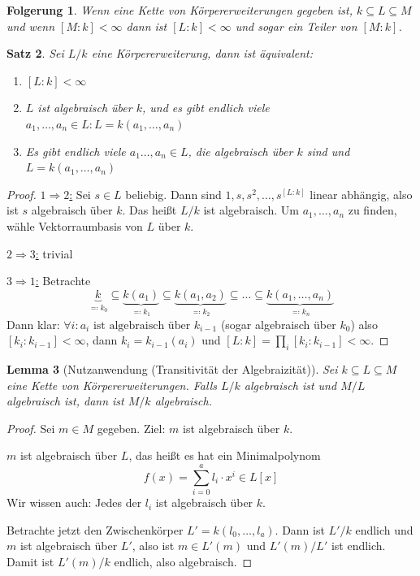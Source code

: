 \documentclass[a4paper,12pt,numbers=noenddot,parskip=full]{scrartcl}
\newcommand{\heading}{\underline}
\theoremstyle{dotless}
\newtheorem{theorem}{Satz}[section]
\newtheorem{corollary}[theorem]{Folgerung}
\newtheorem{lemma}[theorem]{Lemma}
\theoremstyle{remark}
\begin{document}
	\begin{corollary}
		Wenn eine Kette von Körpererweiterungen gegeben ist, $k \subseteq L \subseteq M$ und wenn $[M:k] < \infty$ dann ist $[L:k] < \infty$ und sogar ein Teiler von $[M:k]$.
	\end{corollary}

	\begin{theorem}
		\label{thm:1_27}
		Sei $L/k$ eine Körpererweiterung, dann ist äquivalent:
		\begin{enumerate}
			\item $[L:k] < \infty$
			\item $L$ ist algebraisch über $k$, und es gibt endlich viele $a_1, \dots, a_n \in L: L = k(a_1, \dots, a_n)$
			\item Es gibt endlich viele $a_1 \dots, a_n \in L$, die algebraisch über $k$ sind und $L = k(a_1, \dots, a_n)$
		\end{enumerate}
	\end{theorem}

	\begin{proof}
		\heading{$1 \Rightarrow 2$:} Sei $s \in L$ beliebig. Dann sind $1,s,s^2, \dots, s^{[L:k]}$ linear abhängig, also ist $s$ algebraisch über $k$. Das heißt $L/k$ ist algebraisch.
		Um $a_1, \dots, a_n$ zu finden, wähle Vektorraumbasis von $L$ über $k$.
		
		\heading{$2 \Rightarrow 3$:} trivial
		
		\heading{$3 \Rightarrow 1$:} Betrachte
		\begin{equation*}
			\underbrace{k}_{\eqqcolon k_0} \subseteq \underbrace{k(a_1)}_{\eqqcolon k_1} \subseteq \underbrace{k(a_1, a_2)}_{\eqqcolon k_2} \subseteq \dots \subseteq \underbrace{k(a_1, \dots, a_n)}_{\eqqcolon k_n}
		\end{equation*}
		Dann klar: $\forall i: a_i \text{ ist algebraisch über } k_{i-1}$ (sogar algebraisch über $k_0$) also $[k_i: k_{i-1}] < \infty$, dann $k_i = k_{i-1}(a_i)$ und $[L:k] = \prod_i [k_i: k_{i-1}] < \infty$.
	\end{proof}

	\begin{lemma}[Nutzanwendung (Transitivität der Algebraizität)]
		Sei $k \subseteq L \subseteq M$ eine Kette von Körpererweiterungen. Falls $L/k$ algebraisch ist und $M/L$ algebraisch ist, dann ist $M/k$ algebraisch.
	\end{lemma}

	\begin{proof}
		Sei $m \in M$ gegeben. Ziel: $m$ ist algebraisch über $k$.
		
		$m$ ist algebraisch über $L$, das heißt es hat ein Minimalpolynom
		\begin{equation*}
			f(x) = \sum_{i=0}^a l_i \cdot x^i \in L[x]
		\end{equation*}
		Wir wissen auch: Jedes der $l_i$ ist algebraisch über $k$.
		
		Betrachte jetzt den Zwischenkörper $L' = k(l_0, \dots, l_a)$. Dann ist $L'/k$ endlich und $m$ ist algebraisch über $L'$, also ist $m \in L'(m)$ und $L'(m)/L'$ ist endlich. Damit ist $L'(m)/k$ endlich, also algebraisch.
	\end{proof}
\end{document}
